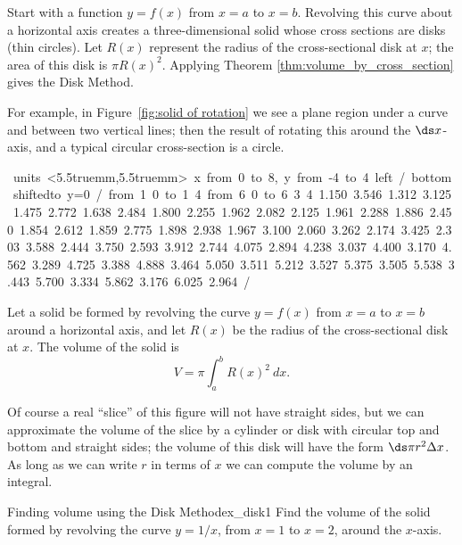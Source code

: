 Start with a function $y=f(x)$ from $x=a$ to $x=b$. Revolving this curve about a horizontal axis creates a three-dimensional solid whose cross sections are disks (thin circles). Let $R(x)$ represent the radius of the cross-sectional disk at $x$; the area of this disk is $\pi R(x)^2$. Applying Theorem \ref{thm:volume_by_cross_section} gives the Disk Method.

For example, in Figure~\ref{fig:solid of rotation} 
we see a plane region under a curve and between two
vertical lines; then the result of rotating this around the $\ds x$-axis, and
a typical circular cross-section is a circle.

\figure[H]
\centerline{
\vbox{\hbox{\hfill{}\vbox{
\beginpicture
\normalgraphs
\setcoordinatesystem units <5.5truemm,5.5truemm>
\setplotarea x from 0 to 8, y from -4 to 4
\axis left /
\axis bottom shiftedto y=0 / 
\putrule from 1 0 to 1 4 
\putrule from 6 0 to 6 3
 4 1.150 3.546 
1.312 3.125 1.475 2.772 1.638 2.484 1.800 2.255 1.962 2.082 
2.125 1.961 2.288 1.886 2.450 1.854 2.612 1.859 2.775 1.898 
2.938 1.967 3.100 2.060 3.262 2.174 3.425 2.303 3.588 2.444 
3.750 2.593 3.912 2.744 4.075 2.894 4.238 3.037 4.400 3.170 
4.562 3.289 4.725 3.388 4.888 3.464 5.050 3.511 5.212 3.527 
5.375 3.505 5.538 3.443 5.700 3.334 5.862 3.176 6.025 2.964 /
\endpicture}
\quad{}
\quad{}
\hfill}\vglue-0pt}}
\caption{\label{fig:solid of rotation} A solid of rotation.}
\endfigure

\begin{formulabox}
{Let a solid be formed by revolving the curve $y=f(x)$ from $x=a$ to $x=b$ around a horizontal axis, and let $R(x)$ be the radius of the cross-sectional disk at $x$. The volume of the solid is
$$V = \pi \int_a^b R(x)^2\ dx.$$
}
\end{formulabox}


Of course a real ``slice'' of this figure will not have straight
sides, but we can approximate the volume of the slice by a cylinder or
disk with circular top and bottom and straight sides; the volume of
this disk will have the form $\ds \pi r^2\Delta x$. As long as we can
write $r$ in terms of $x$ we can compute the volume by an integral.

\begin{example}{Finding volume using the Disk Method}{ex_disk1}{
Find the volume of the solid formed by revolving the curve $y=1/x$, from $x=1$ to $x=2$, around the $x$-axis.}
\end{example}

